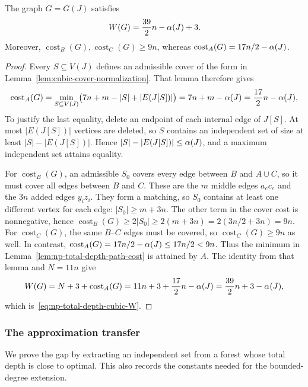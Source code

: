 \begin{lemma}
\label{lem:np-total-depth-cubic}
The graph $G=G(J)$ satisfies
\begin{equation}\label{eq:np-total-depth-cubic-W}
 W(G)=\frac{39}{2}n-\alpha(J)+3.
\end{equation}
Moreover, $\operatorname{cost}_B(G),\operatorname{cost}_C(G)\ge9n$,
whereas $\operatorname{cost}_A(G)=17n/2-\alpha(J)$.
\end{lemma}


\begin{proof}
Every $S\subseteq V(J)$ defines an admissible cover of the form in
Lemma~\ref{lem:cubic-cover-normalization}. That lemma therefore gives
\[
 \operatorname{cost}_A(G)=\min_{S\subseteq V(J)}
       \bigl(7n+m-|S|+|E(J[S])|\bigr)
       =7n+m-\alpha(J)
       =\frac{17}{2}n-\alpha(J),
\]
To justify the last equality, delete an endpoint of each internal
edge of $J[S]$. At most $|E(J[S])|$ vertices are deleted, so $S$
contains an independent set of size at least $|S|-|E(J[S])|$. Hence
$|S|-|E(J[S])|\le\alpha(J)$, and a maximum independent set attains
equality.

For $\operatorname{cost}_B(G)$, an admissible $S_0$ covers every edge
between $B$ and $A\cup C$, so it must cover all edges between $B$ and
$C$. These are the $m$ middle edges $a_ec_e$ and the $3n$ added edges
$y_iz_i$. They form a matching, so $S_0$ contains at least one
different vertex for each edge: $|S_0|\ge m+3n$. The other term in
the cover cost is nonnegative, hence
$\operatorname{cost}_B(G)\ge2|S_0|\ge2(m+3n)
 =2(3n/2+3n)=9n$.
For $\operatorname{cost}_C(G)$, the same $B$--$C$ edges must be
covered, so $\operatorname{cost}_C(G)\ge9n$ as well. In contrast,
$\operatorname{cost}_A(G)=17n/2-\alpha(J)\le17n/2<9n$.
Thus the minimum in Lemma~\ref{lem:np-total-depth-path-cost} is
attained by $A$. The identity from that lemma and $N=11n$ give
\[
 W(G)=N+3+\operatorname{cost}_A(G)
 =11n+3+\frac{17}{2}n-\alpha(J)
 =\frac{39}{2}n+3-\alpha(J),
\]
which is~\eqref{eq:np-total-depth-cubic-W}.
\end{proof}

\subsubsection{The approximation transfer}

We prove the gap by extracting an independent set from a forest whose
total depth is close to optimal. This also records the constants
needed for the bounded-degree extension.

